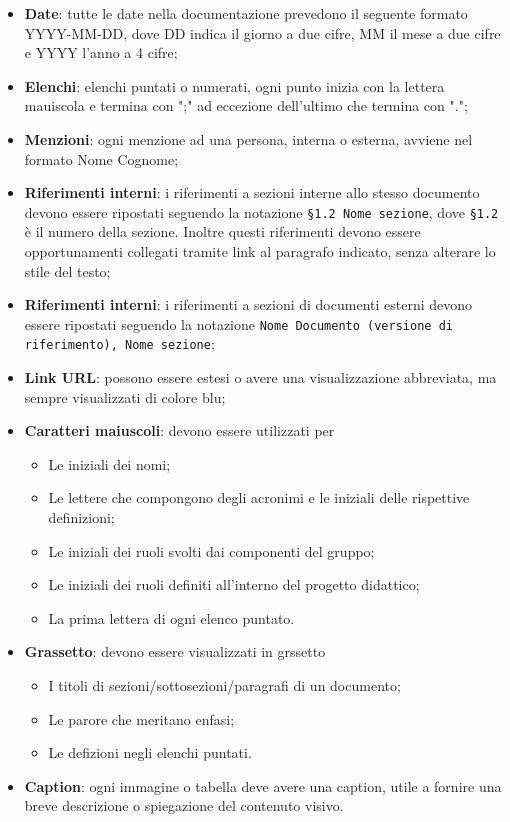 \begin{itemize}
    \item \textbf{Date}: tutte le date nella documentazione prevedono il seguente formato YYYY-MM-DD, dove DD indica il giorno a due cifre, MM il mese a due cifre e YYYY l'anno a 4 cifre;
    \item \textbf{Elenchi}: elenchi puntati o numerati, ogni punto inizia con la lettera mauiscola e termina con ";" ad eccezione dell'ultimo che termina con ".";
    \item \textbf{Menzioni}: ogni menzione ad una persona, interna o esterna, avviene nel formato Nome Cognome;
    \item \textbf{Riferimenti interni}: i riferimenti a sezioni interne allo stesso documento devono essere ripostati seguendo la notazione \texttt{§1.2 Nome sezione}, dove \texttt{§1.2} è il numero della sezione. Inoltre questi riferimenti devono essere opportunamenti collegati tramite link al paragrafo indicato, senza alterare lo stile del testo;
    \item \textbf{Riferimenti interni}: i riferimenti a sezioni di documenti esterni devono essere ripostati seguendo la notazione \texttt{Nome Documento (versione di riferimento), Nome sezione};
     \item \textbf{Link URL}: possono essere estesi o avere una visualizzazione abbreviata, ma sempre visualizzati di colore blu;
    \item \textbf{Caratteri maiuscoli}: devono essere utilizzati per
        \begin{itemize}
            \item Le iniziali dei nomi;
            \item Le lettere che compongono degli acronimi e le iniziali delle rispettive definizioni;
            \item Le iniziali dei ruoli svolti dai componenti del gruppo;
            \item Le iniziali dei ruoli definiti all'interno del progetto didattico;
            \item La prima lettera di ogni elenco puntato.
        \end{itemize}
    \item \textbf{Grassetto}: devono essere visualizzati in grssetto
        \begin{itemize}
            \item I titoli di sezioni/sottosezioni/paragrafi di un documento;
            \item Le parore che meritano enfasi;
            \item Le defizioni negli elenchi puntati.
        \end{itemize}
    \item \textbf{Caption}: ogni immagine o tabella deve avere una caption, utile a fornire una breve descrizione o spiegazione del contenuto visivo.
\end{itemize}

